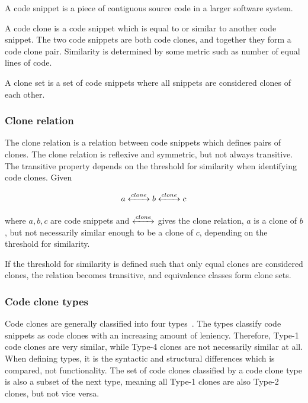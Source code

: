 \begin{definition}
	A code snippet is a piece of contiguous source code in a larger software system.
\end{definition}

\begin{definition}
	A code clone is a code snippet which is equal to or similar to another code snippet. The two
	code snippets are both code clones, and together they form a code clone pair.
	Similarity is determined by some metric such as number of equal lines of code.
\end{definition}

\begin{definition}
	A clone set is a set of code snippets where all snippets are considered clones of each
	other.
\end{definition}

\subsubsection{Clone relation}

The clone relation is a relation between code snippets which defines pairs of clones.
The clone relation is reflexive and symmetric, but not always transitive. The transitive
property depends on the threshold for similarity when identifying code clones. Given

$$a \xleftrightarrow{clone} b \xleftrightarrow{clone} c$$


where $a,b,c$ are code snippets and $\xleftrightarrow{clone}$ gives the clone relation, $a$ is
a clone of $b$, but not necessarily similar enough to be a clone of $c$, depending on the
threshold for similarity.

If the threshold for similarity is defined such that only equal clones are considered
clones, the relation becomes transitive, and equivalence classes form clone sets.

\subsubsection{Code clone types}

Code clones are generally classified into four types~\cite{Inoue_introduction_to_cc}. The
types classify code snippets as code clones with an increasing amount of leniency.
Therefore, Type-1 code clones are very similar, while Type-4 clones are not necessarily
similar at all. When defining types, it is the syntactic and structural differences which
is compared, not functionality. The set of code clones classified by a code clone type
is also a subset of the next type, meaning all Type-1 clones are also Type-2 clones, but
not vice versa.

